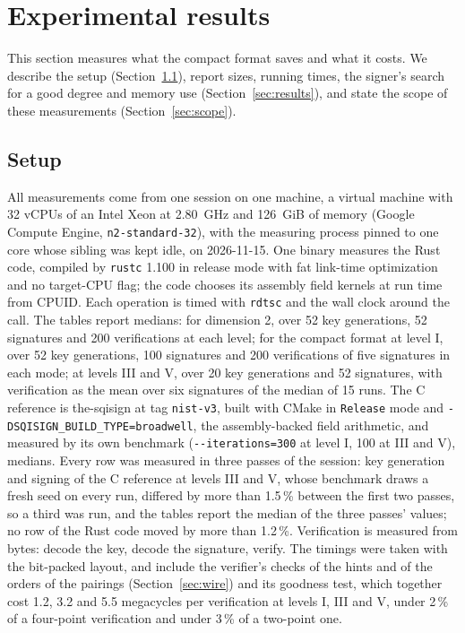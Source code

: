 \documentclass[version=preprint]{iacrcc}
\begin{document}
    \section{Experimental results}
    \label{sec:bench}

    This section measures what the compact format saves and what it costs. We
    describe the setup (Section~\ref{sec:setup}), report sizes, running times,
    the signer's search for a good degree and memory use
    (Section~\ref{sec:results}), and state the scope of these measurements
    (Section~\ref{sec:scope}).

    \subsection{Setup}
    \label{sec:setup}
    All measurements come from one session on one machine, a virtual machine
    with 32 vCPUs of an Intel Xeon at 2.80~GHz and 126~GiB of memory (Google
    Compute Engine, \texttt{n2-standard-32}), with the measuring process
    pinned to one core whose sibling was kept idle, on 2026-11-15. One binary measures the Rust code, compiled by \texttt{rustc}
    1.100 in release mode with fat link-time optimization and no target-CPU
    flag; the code chooses its assembly field kernels at run time from CPUID.
    Each operation is timed with \texttt{rdtsc} and the wall clock around the
    call. The tables report medians: for dimension 2, over 52 key generations,
    52 signatures and 200 verifications at each level; for the compact format
    at level I, over 52 key generations, 100 signatures and 200 verifications
    of five signatures in each mode; at levels III and V, over 20 key
    generations and 52 signatures, with verification as the mean over six
    signatures of the median of 15 runs. The C reference is the-sqisign at tag
    \texttt{nist-v3}, built with CMake in \texttt{Release} mode and
    \texttt{-DSQISIGN\_BUILD\_TYPE=broadwell}, the assembly-backed field
    arithmetic, and measured by its own benchmark
    (\texttt{-{}-iterations=300} at level I, 100 at III and V), medians. Every row was measured in three passes of the session: key generation and signing of the C reference at levels III and V, whose benchmark draws a fresh seed on every run, differed by more than 1.5\,\% between the first two passes, so a third was run, and the tables report the median of the three passes' values; no row of the Rust code moved by more than 1.2\,\%.
    Verification is measured from bytes: decode the key, decode the signature,
    verify. The timings were taken with the bit-packed layout, and include the
    verifier's checks of the hints and of the orders of the pairings
    (Section~\ref{sec:wire}) and its goodness test, which together cost
    1.2, 3.2 and 5.5 megacycles per verification at levels I, III and V, under
    2\,\% of a four-point verification and under 3\,\% of a two-point one.
\end{document}
